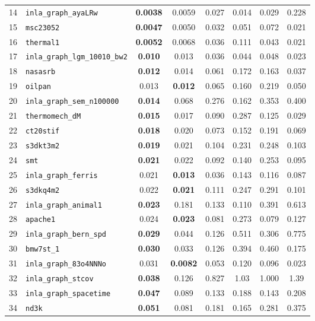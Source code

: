 \begin{footnotesize}
\begin{longtable}{rl cccccc}
14 & \texttt{inla\_graph\_ayaLRw} & \textbf{0.0038} & 0.0059 & 0.027 & 0.014 & 0.029 & 0.228 \\
15 & \texttt{msc23052} & \textbf{0.0047} & 0.0050 & 0.032 & 0.051 & 0.072 & 0.021 \\
16 & \texttt{thermal1} & \textbf{0.0052} & 0.0068 & 0.036 & 0.111 & 0.043 & 0.021 \\
17 & \texttt{inla\_graph\_lgm\_10010\_bw2} & \textbf{0.010} & 0.013 & 0.036 & 0.044 & 0.048 & 0.023 \\
18 & \texttt{nasasrb} & \textbf{0.012} & 0.014 & 0.061 & 0.172 & 0.163 & 0.037 \\
19 & \texttt{oilpan} & 0.013 & \textbf{0.012} & 0.065 & 0.160 & 0.219 & 0.050 \\
20 & \texttt{inla\_graph\_sem\_n100000} & \textbf{0.014} & 0.068 & 0.276 & 0.162 & 0.353 & 0.400 \\
21 & \texttt{thermomech\_dM} & \textbf{0.015} & 0.017 & 0.090 & 0.287 & 0.125 & 0.029 \\
22 & \texttt{ct20stif} & \textbf{0.018} & 0.020 & 0.073 & 0.152 & 0.191 & 0.069 \\
23 & \texttt{s3dkt3m2} & \textbf{0.019} & 0.021 & 0.104 & 0.231 & 0.248 & 0.103 \\
24 & \texttt{smt} & \textbf{0.021} & 0.022 & 0.092 & 0.140 & 0.253 & 0.095 \\
25 & \texttt{inla\_graph\_ferris} & 0.021 & \textbf{0.013} & 0.036 & 0.143 & 0.116 & 0.087 \\
26 & \texttt{s3dkq4m2} & 0.022 & \textbf{0.021} & 0.111 & 0.247 & 0.291 & 0.101 \\
27 & \texttt{inla\_graph\_animal1} & \textbf{0.023} & 0.181 & 0.133 & 0.110 & 0.391 & 0.613 \\
28 & \texttt{apache1} & 0.024 & \textbf{0.023} & 0.081 & 0.273 & 0.079 & 0.127 \\
29 & \texttt{inla\_graph\_bern\_spd} & \textbf{0.029} & 0.044 & 0.126 & 0.511 & 0.306 & 0.775 \\
30 & \texttt{bmw7st\_1} & \textbf{0.030} & 0.033 & 0.126 & 0.394 & 0.460 & 0.175 \\
31 & \texttt{inla\_graph\_83o4NNNo} & 0.031 & \textbf{0.0082} & 0.053 & 0.120 & 0.096 & 0.023 \\
32 & \texttt{inla\_graph\_stcov} & \textbf{0.038} & 0.126 & 0.827 & 1.03 & 1.000 & 1.39 \\
33 & \texttt{inla\_graph\_spacetime} & \textbf{0.047} & 0.089 & 0.133 & 0.188 & 0.143 & 0.208 \\
34 & \texttt{nd3k} & \textbf{0.051} & 0.081 & 0.181 & 0.165 & 0.281 & 0.375 \\

\end{longtable}
\end{footnotesize}
